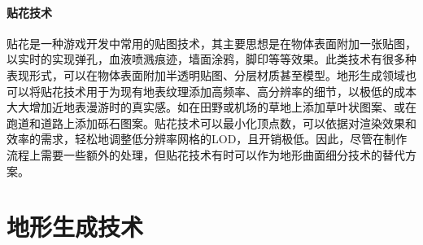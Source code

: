 \paragraph{贴花技术}
贴花是一种游戏开发中常用的贴图技术，其主要思想是在物体表面附加一张贴图，以实时的实现弹孔，血液喷溅痕迹，墙面涂鸦，脚印等等效果。此类技术有很多种表现形式，可以在物体表面附加半透明贴图、分层材质甚至模型。地形生成领域也可以将贴花技术用于为现有地表纹理添加高频率、高分辨率的细节，以极低的成本大大增加近地表漫游时的真实感。如在田野或机场的草地上添加草叶状图案、或在跑道和道路上添加砾石图案。贴花技术可以最小化顶点数，可以依据对渲染效果和效率的需求，轻松地调整低分辨率网格的LOD，且开销极低。因此，尽管在制作流程上需要一些额外的处理，但贴花技术有时可以作为地形曲面细分技术的替代方案。

\section{地形生成技术}
